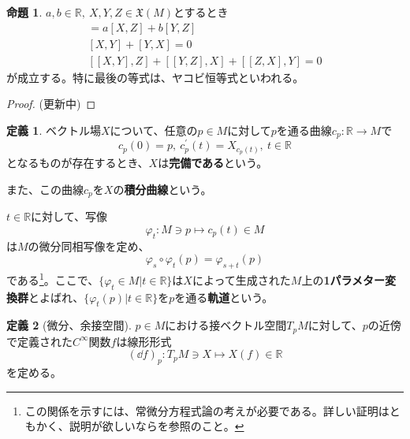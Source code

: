 \documentclass[unicode,a4paper,11pt]{ltjsarticle}
\theoremstyle{definition}
\newtheorem{dfn}{定義}[section]
\newtheorem{prop}{命題}[section]
\begin{document}
\begin{prop}
  $a,b\in \mathbb{R},\ X,Y,Z\in \mathfrak{X}(M)$とするとき
  \begin{gather}
    [aX+bY,Z]
    =
    a[X,Z]
    +
    b[Y,Z]
    \\
    [X,Y]
    +
    [Y,X]
    =
    0
    \\
    [[X,Y],Z]
    +
    [[Y,Z],X]
    +
    [[Z,X],Y]
    =
    0
  \end{gather}
  が成立する。特に最後の等式は、ヤコビ恒等式といわれる。
\end{prop}

\begin{proof}
  \label{prf:prop_1_1}
  (更新中)
\end{proof}

\begin{dfn}
  ベクトル場$X$について、任意の$p\in M$に対して$p$を通る曲線$c_{p}:\mathbb{R}\rightarrow M$で
  \begin{equation}
    c_{p}(0)
    =
    p
    ,\
    c^{\prime}_{p}(t)
    =
    X_{c_{p}(t)}
    ,\
    t\in\mathbb{R}
  \end{equation}
  となるものが存在するとき、$X$は\textbf{完備である}という。

  また、この曲線$c_{p}$を$X$の\textbf{積分曲線}という。

  $t\in\mathbb{R}$に対して、写像
  \begin{equation}
    \varphi_{t}:M\ni p\mapsto c_{p}(t)\in M
  \end{equation}
  は$M$の微分同相写像を定め、
  \begin{equation}
    \varphi_{s}\circ\varphi_{t}(p)
    =
    \varphi_{s+t}(p)
    \label{eqn:one_parameter_grp}
  \end{equation}
  である\footnote{
    この関係を示すには、常微分方程式論の考えが必要である。詳しい証明はともかく、説明が欲しいなら\cite{Nakahara:2003}を参照のこと。
  }。ここで、$\{\varphi_{t}\in M|t\in \mathbb{R}\}$は$X$によって生成された$M$上の\textbf{1パラメター変換群}とよばれ、$\{\varphi_{t}(p)|t\in\mathbb{R}\}$を$p$を通る\textbf{軌道}という。
\end{dfn}

\begin{dfn}[微分、余接空間]
  $p\in M$における接ベクトル空間$T_{p}M$に対して、$p$の近傍で定義された$C^{\infty}$関数$f$は線形形式
  \begin{equation}
    (\dd f)_{p}
    :
    T_{p}M\ni X\mapsto X(f)\in\mathbb{R}
  \end{equation}
  を定める。
\end{dfn}
\end{document}
